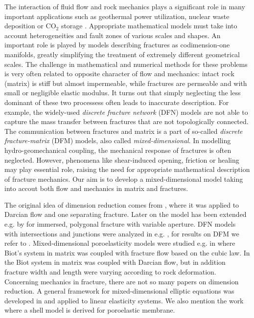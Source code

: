 \documentclass[a4paper]{article}
\begin{document}
The interaction of fluid flow and rock mechanics plays a significant role in many important applications such as geothermal power utilization, nuclear waste deposition or CO${}_2$ storage \cite{rutqvist2003role}.
Appropriate mathematical models must take into account heterogeneities and fault zones of various scales and shapes.
An important role is played by models describing fractures as codimension-one manifolds, greatly simplifying the treatment of extremely different geometrical scales.
The challenge in mathematical and numerical methods for these problems is very often related to opposite character of flow and mechanics: intact rock (matrix) is stiff but almost impermeable, while fractures are permeable and with small or negligible elastic modulus.
It turns out that simply neglecting the less dominant of these two processess often leads to inaccurate description.
For example, the widely-used \textit{discrete fracture network} (DFN) models are not able to capture the mass transfer between fractures that are not topologically connected.
The communication between fractures and matrix is a part of so-called \textit{discrete fracture-matrix} (DFM) models, also called \textit{mixed-dimensional}.
In modelling hydro-geomechanical coupling, the mechanical response of fractures is often neglected.
However, phenomena like shear-induced opening, friction or healing may play essential role, raising the need for appropriate mathematical description of fracture mechanics.
Our aim is to develop a mixed-dimensional model taking into accout both flow and mechanics in matrix and fractures.

The original idea of dimension reduction comes from \cite{martin_modeling_2005}, where it was applied to Darcian flow and one separating fracture.
Later on the model has been extended e.g. by \cite{angot2009asymptotic} for immersed, polygonal fracture with variable aperture.
DFN models with intersections and junctions were analyzed in e.g. \cite{maryska2005numerical,pichot2012generalized,formaggia2014reduced}, for results on DFM we refer to \cite{schwenck2015dimensionally}.
% 
Mixed-dimensional poroelasticity models were studied e.g. in \cite{ganis2014modeling} where Biot's system in matrix was coupled with fracture flow based on the cubic law.
In \cite{hanowski2018hydromechanical} the Biot system in matrix was coupled with Darcian flow, but in addition fracture width and length were varying according to rock deformation.
Concerning mechanics in fracture, there are not so many papers on dimension reduction.
A general framework for mixed-dimensional elliptic equations was developed in \cite{boon2017functional,boon2019stable} and applied to linear elasticity systems.
We also mention the work \cite{mikelic2019derivation} where a shell model is derived for poroelastic membrane.
\end{document}
